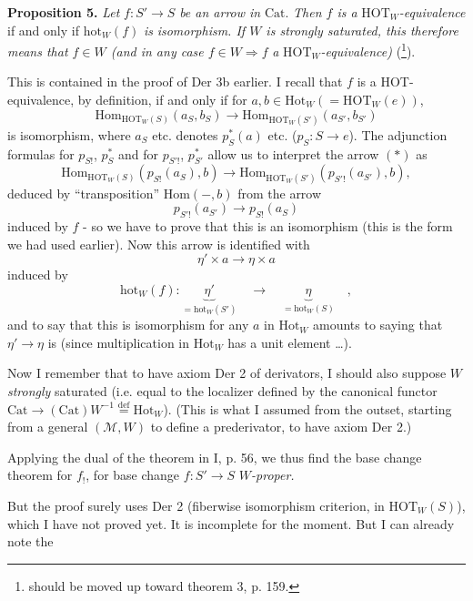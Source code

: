 \documentclass[11pt]{article}
\newcommand{\msp}[1]{\marginpar{\footnotesize [#1]}}
\newcommand{\HOT}{\mathrm{HOT}}
\newcommand{\hot}{\mathrm{hot}}
\newcommand{\Hot}{\mathrm{Hot}}
\newcommand{\Cat}{\mathrm{Cat}}
\newcommand{\Hom}{\mathrm{Hom}}
\begin{document}
\noindent\textbf{Proposition 5.} \textit{Let} $f : S' \longrightarrow S$ \textit{be an arrow in} $\Cat$. \textit{Then $f$ is a} $\HOT_W$\textit{-equivalence} if and only if $\hot_W(f)$ \textit{is} \textit{isomorphism. If $W$ is strongly saturated, this therefore means that $f \in W$ (and in any case $f \in W \Longrightarrow f$} \textit{a} $\HOT_W$\textit{-equivalence)} (\footnote[81]{should be moved up toward theorem 3, p. 159.}).

This is contained in the proof of Der 3b earlier. I recall that $f$ is a HOT-equivalence, by definition, if and only if for $a, b \in \Hot_W (= \HOT_W(e))$,
\[
\Hom_{\HOT_W(S)}(a_S, b_S) \longrightarrow \Hom_{\HOT_W(S')}(a_{S'}, b_{S'}) \tag*{$(*)$}
\]
is isomorphism, where $a_S$ etc. denotes $p_S^*(a)$ etc. ($p_S : S \longrightarrow e$). The adjunction formulas for $p_{S!}$, $p_S^*$ and for $p_{S'!}$, $p_{S'}^*$ allow us to interpret the arrow $(*)$ as
\[
\Hom_{\HOT_W(S)}(p_{S!}(a_S), b) \longrightarrow \Hom_{\HOT_W(S')}(p_{S'!}(a_{S'}), b),
\]
\msp{page 165}deduced by ``transposition'' $\Hom(-, b)$ from the arrow
\[
p_{S'!}(a_{S'}) \longrightarrow p_{S!}(a_S)
\]
induced by $f$ - so we have to prove that this is an isomorphism (this is the form we had used earlier). Now this arrow is identified with
\[
\eta' \times a \longrightarrow \eta \times a
\]
induced by
\[
\hot_W(f) : \underbrace{\eta'}_{= \hot_W(S')} \quad \longrightarrow \quad \underbrace{\eta}_{= \hot_W(S)} \quad ,
\]
and to say that this is isomorphism for any $a$ in $\Hot_W$ amounts to saying that $\eta' \longrightarrow \eta$ is (since multiplication in $\Hot_W$ has a unit element \dots). %

Now I remember that to have axiom Der 2 of derivators, I should also suppose $W$ \textit{strongly} saturated (i.e. equal to the localizer defined by the canonical functor $\Cat \longrightarrow (\Cat)W^{-1} \overset{\text{def}}{=} \Hot_W$). (This is what I assumed from the outset, starting from a general $(\mathcal{M}, W)$ to define a prederivator, to have axiom Der 2.)

Applying the dual of the theorem in I, p. 56, we thus find the base change theorem for $f_!$, for base change $f : S' \longrightarrow S$ \textit{$W$-proper.}

\msp{page 166}\marginpar{$\Vert$}But the proof surely uses Der 2 (fiberwise isomorphism criterion, in $\HOT_W(S)$), which I have not proved yet. It is incomplete for the moment. But I can already note the
\end{document}
